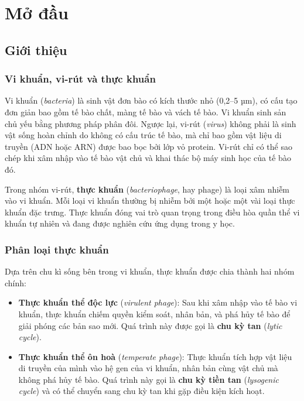 \chapter{Mở đầu}
\setcounter{page}{1}
\section{Giới thiệu}

\subsection{Vi khuẩn, vi-rút và thực khuẩn}

Vi khuẩn (\textit{bacteria}) là sinh vật đơn bào có kích thước nhỏ (0{,}2–5 µm), có cấu tạo đơn giản bao gồm tế bào chất, màng tế bào và vách tế bào. Vi khuẩn sinh sản chủ yếu bằng phương pháp phân đôi. Ngược lại, vi-rút (\textit{virus}) không phải là sinh vật sống hoàn chỉnh do không có cấu trúc tế bào, mà chỉ bao gồm vật liệu di truyền (ADN hoặc ARN) được bao bọc bởi lớp vỏ protein. Vi-rút chỉ có thể sao chép khi xâm nhập vào tế bào vật chủ và khai thác bộ máy sinh học của tế bào đó.

Trong nhóm vi-rút, \textbf{thực khuẩn} (\textit{bacteriophage}, hay phage) là loại xâm nhiễm vào vi khuẩn. Mỗi loại vi khuẩn thường bị nhiễm bởi một hoặc một vài loại thực khuẩn đặc trưng. Thực khuẩn đóng vai trò quan trọng trong điều hòa quần thể vi khuẩn tự nhiên và đang được nghiên cứu ứng dụng trong y học.

\subsection{Phân loại thực khuẩn}

Dựa trên chu kì sống bên trong vi khuẩn, thực khuẩn được chia thành hai nhóm chính:

\begin{itemize}
    \item \textbf{Thực khuẩn thể độc lực} (\textit{virulent phage}): Sau khi xâm nhập vào tế bào vi khuẩn, thực khuẩn chiếm quyền kiểm soát, nhân bản, và phá hủy tế bào để giải phóng các bản sao mới. Quá trình này được gọi là \textbf{chu kỳ tan} (\textit{lytic cycle}).
    \item \textbf{Thực khuẩn thể ôn hoà} (\textit{temperate phage}): Thực khuẩn tích hợp vật liệu di truyền của mình vào hệ gen của vi khuẩn, nhân bản cùng vật chủ mà không phá hủy tế bào. Quá trình này gọi là \textbf{chu kỳ tiền tan} (\textit{lysogenic cycle}) và có thể chuyển sang chu kỳ tan khi gặp điều kiện kích hoạt.
\end{itemize}

